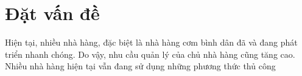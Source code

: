 \documentclass[../DoAn.tex]{subfiles}
\begin{document}
    \section{Đặt vấn đề}
    \label{section:1.1}

    Hiện tại, nhiều nhà hàng, đặc biệt là nhà hàng cơm bình dân đã và đang phát triển nhanh chóng. Do vậy, nhu cầu quản lý của chủ nhà hàng cũng tăng cao. Nhiều nhà hàng hiện tại vẫn đang sử dụng những phương thức thủ công 
\end{document}
